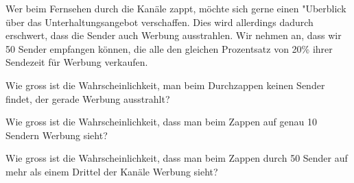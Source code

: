 Wer beim Fernsehen durch die Kanäle zappt, möchte sich gerne einen
"Uberblick über das Unterhaltungsangebot verschaffen.  Dies wird allerdings dadurch erschwert, dass die Sender
auch Werbung ausstrahlen. Wir nehmen an, dass wir 50 Sender empfangen
können, die alle den gleichen Prozentsatz von 20\%
ihrer Sendezeit für Werbung verkaufen.
\begin{teilaufgaben}
\item
Wie gross ist die Wahrscheinlichkeit, man beim Durchzappen
keinen Sender findet, der gerade Werbung ausstrahlt?
\item
Wie gross ist die Wahrscheinlichkeit, dass man beim Zappen auf
genau 10 Sendern Werbung sieht?
\item
Wie gross ist die Wahrscheinlichkeit, dass man beim Zappen durch
50 Sender auf mehr als einem Drittel der Kanäle Werbung sieht?
\end{teilaufgaben}


